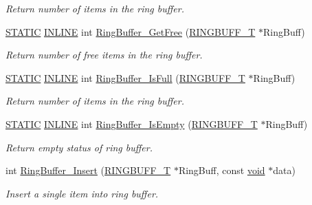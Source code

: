 \begin{DoxyCompactItemize}
\begin{DoxyCompactList}\small\item\em Return number of items in the ring buffer. \end{DoxyCompactList}\item 
\hyperlink{group__LPC__Types__Public__Macros_ga10b2d890d871e1489bb02b7e70d9bdfb}{S\-T\-A\-T\-I\-C} \hyperlink{group__LPC__Types__Public__Types_ga2eb6f9e0395b47b8d5e3eeae4fe0c116}{I\-N\-L\-I\-N\-E} int \hyperlink{group__Ring__Buffer_ga75424687def8979742338366d39c8559}{Ring\-Buffer\-\_\-\-Get\-Free} (\hyperlink{structRINGBUFF__T}{R\-I\-N\-G\-B\-U\-F\-F\-\_\-\-T} $\ast$Ring\-Buff)
\begin{DoxyCompactList}\small\item\em Return number of free items in the ring buffer. \end{DoxyCompactList}\item 
\hyperlink{group__LPC__Types__Public__Macros_ga10b2d890d871e1489bb02b7e70d9bdfb}{S\-T\-A\-T\-I\-C} \hyperlink{group__LPC__Types__Public__Types_ga2eb6f9e0395b47b8d5e3eeae4fe0c116}{I\-N\-L\-I\-N\-E} int \hyperlink{group__Ring__Buffer_ga760da012435262add1d8d7aa79e873a0}{Ring\-Buffer\-\_\-\-Is\-Full} (\hyperlink{structRINGBUFF__T}{R\-I\-N\-G\-B\-U\-F\-F\-\_\-\-T} $\ast$Ring\-Buff)
\begin{DoxyCompactList}\small\item\em Return number of items in the ring buffer. \end{DoxyCompactList}\item 
\hyperlink{group__LPC__Types__Public__Macros_ga10b2d890d871e1489bb02b7e70d9bdfb}{S\-T\-A\-T\-I\-C} \hyperlink{group__LPC__Types__Public__Types_ga2eb6f9e0395b47b8d5e3eeae4fe0c116}{I\-N\-L\-I\-N\-E} int \hyperlink{group__Ring__Buffer_ga6f03e04a69262864bde4f35fc6f3dfb5}{Ring\-Buffer\-\_\-\-Is\-Empty} (\hyperlink{structRINGBUFF__T}{R\-I\-N\-G\-B\-U\-F\-F\-\_\-\-T} $\ast$Ring\-Buff)
\begin{DoxyCompactList}\small\item\em Return empty status of ring buffer. \end{DoxyCompactList}\item 
int \hyperlink{group__Ring__Buffer_gaafdee54f2525b2c7a983d1a631b42226}{Ring\-Buffer\-\_\-\-Insert} (\hyperlink{structRINGBUFF__T}{R\-I\-N\-G\-B\-U\-F\-F\-\_\-\-T} $\ast$Ring\-Buff, const \hyperlink{Paradigm_2Tern__EE_2small_2portmacro_8h_a14d32f8130d3c0b212cfc751730b5b49}{void} $\ast$data)
\begin{DoxyCompactList}\small\item\em Insert a single item into ring buffer. \end{DoxyCompactList}\item 

\end{DoxyCompactItemize}
